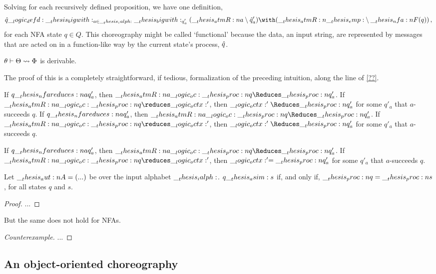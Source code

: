 Solving for each recursively defined proposition, we have one definition, 
\begin{equation*}
  \defp{q} \defd \bigwith_{a \in \ialph} \bigwith_{q\smash{'_a}} (\atmR{a} \limp \defp{q}'_a) \with (\atmR{\emp} \limp \nfa{F}(q))
  \,,
\end{equation*}
for each \ac{NFA} state $q \in Q$.
This choreography might be called \enquote*{functional} because the data, an input string, are represented by messages that are acted on in a function-like way by the current state's process, $\hat{q}$.

\begin{theorem}\label{thm:choreographies:nfa-functional-chorsig}
  $\theta \vdash \Theta \rightsquigarrow \Phi$ is derivable.
\end{theorem}
%
\noindent
The proof of this  is a completely straightforward, if tedious, formalization of the preceding intuition, along the line of \cref{??}.

\begin{corollary}
  If $q \nfareduces[a] q'_a$, then $\atmR{a} \oc \proc{q} \Reduces \proc{q}'_a$.
  If $\atmR{a} \oc \proc{q} \reduces \octx'$, then $\octx' \Reduces \proc{q}'_a$ for some $q'_a$ that $a$-succeeds $q$.
  If $q \nfareduces[a] q'_a$, then $\atmR{a} \oc \proc{q} \Reduces \proc{q}'_a$.
  If $\atmR{a} \oc \proc{q} \reduces \octx'$, then $\octx' \Reduces \proc{q}'_a$ for some $q'_a$ that $a$-succeeds $q$.
\end{corollary}

\begin{corollary}
  If $q \nfareduces[a] q'_a$, then $\atmR{a} \oc \proc{q} \Reduces \proc{q}'_a$.
  If $\atmR{a} \oc \proc{q} \reduces \octx'$, then $\__logic_octx:' = \__thesis_proc:n {q}'_a$ for some $q'_a$ that $a$-succeeds $q$.
\end{corollary}


\begin{theorem}
  Let $\__thesis_aut:n {A} = (...)$ be  over the input alphabet $\__thesis_ialph:$.
  $q \__thesis_asim: s$ if, and only if, $\__thesis_proc:n {q} = \__thesis_proc:n {s}$, for all states $q$ and $s$.
\end{theorem}
\begin{proof}
  ...
\end{proof}

But the same does not hold for \acp{NFA}.
\begin{proof}[Counterexample]
  ...
\end{proof}

\subsection{An object-oriented choreography}

